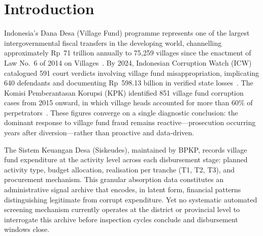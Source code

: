 \documentclass[3p,times,procedia]{elsarticle}
\begin{document}
\vspace*{-6pt}

\section{Introduction}
\label{sec:intro}

Indonesia's Dana Desa (Village Fund) programme represents one of the largest intergovernmental fiscal transfers in the developing world, channelling approximately Rp~71 trillion annually to 75,259 villages since the enactment of Law No.~6 of 2014 on Villages~\cite{ref1}. By 2024, Indonesian Corruption Watch (ICW) catalogued 591 court verdicts involving village fund misappropriation, implicating 640 defendants and documenting Rp~598.13 billion in verified state losses~\cite{ref2}. The Komisi Pemberantasan Korupsi (KPK) identified 851 village fund corruption cases from 2015 onward, in which village heads accounted for more than 60\% of perpetrators~\cite{ref3}. These figures converge on a single diagnostic conclusion: the dominant response to village fund fraud remains reactive---prosecution occurring years after diversion---rather than proactive and data-driven.

The Sistem Keuangan Desa (Siskeudes), maintained by BPKP, records village fund expenditure at the activity level across each disbursement stage: planned activity type, budget allocation, realisation per tranche (T1, T2, T3), and procurement mechanism. This granular absorption data constitutes an administrative signal archive that encodes, in latent form, financial patterns distinguishing legitimate from corrupt expenditure. Yet no systematic automated screening mechanism currently operates at the district or provincial level to interrogate this archive before inspection cycles conclude and disbursement windows close.
\end{document}
